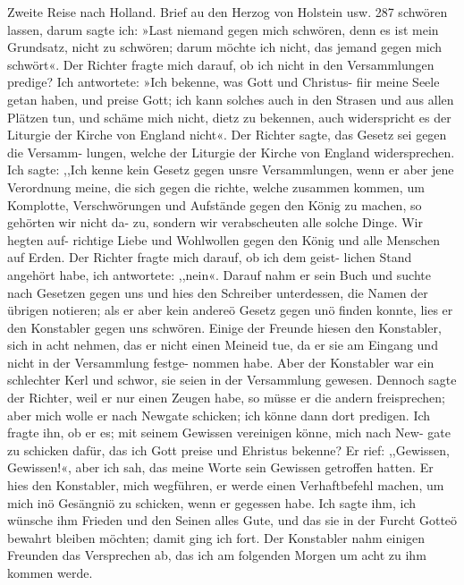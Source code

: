 Zweite Reise nach Holland. Brief au den Herzog von Holstein usw. 287
schwören lassen, darum sagte ich: »Last niemand gegen mich
schwören, denn es ist mein Grundsatz, nicht zu schwören; darum
möchte ich nicht, das jemand gegen mich schwört«. Der Richter
fragte mich darauf, ob ich nicht in den Versammlungen predige?
Ich antwortete: »Ich bekenne, was Gott und Christus- fiir meine
Seele getan haben, und preise Gott; ich kann solches auch in den
Strasen und aus allen Plätzen tun, und schäme mich nicht, dietz zu
bekennen, auch widerspricht es der Liturgie der Kirche von England
nicht«. Der Richter sagte, das Gesetz sei gegen die Versamm-
lungen, welche der Liturgie der Kirche von England widersprechen.
Ich sagte: ,,Ich kenne kein Gesetz gegen unsre Versammlungen,
wenn er aber jene Verordnung meine, die sich gegen die richte,
welche zusammen kommen, um Komplotte, Verschwörungen und
Aufstände gegen den König zu machen, so gehörten wir nicht da-
zu, sondern wir verabscheuten alle solche Dinge. Wir hegten auf-
richtige Liebe und Wohlwollen gegen den König und alle Menschen
auf Erden. Der Richter fragte mich darauf, ob ich dem geist-
lichen Stand angehört habe, ich antwortete: ,,nein«. Darauf
nahm er sein Buch und suchte nach Gesetzen gegen uns und hies
den Schreiber unterdessen, die Namen der übrigen notieren; als
er aber kein andereö Gesetz gegen unö finden konnte, lies er den
Konstabler gegen uns schwören. Einige der Freunde hiesen den
Konstabler, sich in acht nehmen, das er nicht einen Meineid tue,
da er sie am Eingang und nicht in der Versammlung festge-
nommen habe. Aber der Konstabler war ein schlechter Kerl und
schwor, sie seien in der Versammlung gewesen.
Dennoch sagte der Richter, weil er nur einen Zeugen habe,
so müsse er die andern freisprechen; aber mich wolle er nach
Newgate schicken; ich könne dann dort predigen. Ich fragte ihn,
ob er es; mit seinem Gewissen vereinigen könne, mich nach New-
gate zu schicken dafür, das ich Gott preise und Ehristus bekenne?
Er rief: ,,Gewissen, Gewissen!«, aber ich sah, das meine Worte
sein Gewissen getroffen hatten. Er hies den Konstabler, mich
wegführen, er werde einen Verhaftbefehl machen, um mich inö
Gesängniö zu schicken, wenn er gegessen habe. Ich sagte ihm,
ich wünsche ihm Frieden und den Seinen alles Gute, und das sie
in der Furcht Gotteö bewahrt bleiben möchten; damit ging ich
fort. Der Konstabler nahm einigen Freunden das Versprechen
ab, das ich am folgenden Morgen um acht zu ihm kommen werde.


